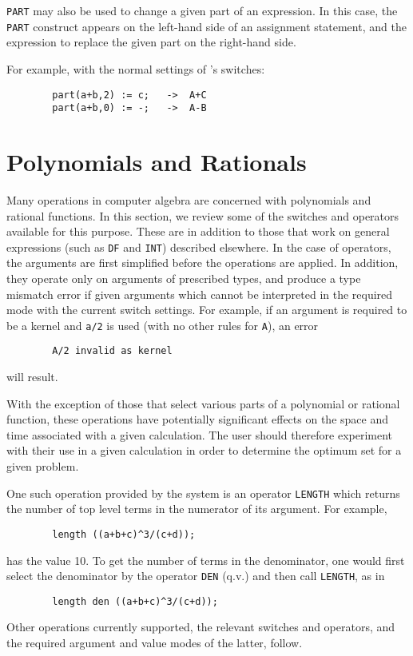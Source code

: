 {\tt PART} may also be used to change a given part of an expression.  In
this case, the {\tt PART} construct appears on the left-hand side of an
assignment statement, and the expression to replace the given part on the
right-hand side.

For example, with the normal settings of {\REDUCE's} switches:
\begin{verbatim}
        part(a+b,2) := c;   ->  A+C
        part(a+b,0) := -;   ->  A-B
\end{verbatim}

\chapter{Polynomials and Rationals}

Many operations in computer algebra are concerned with polynomials
 and rational functions.  In
this section, we review some of the switches and operators available for
this purpose.  These are in addition to those that work on general
expressions (such as {\tt DF} and {\tt INT}) described elsewhere.  In the
case of operators, the arguments are first simplified before the
operations are applied.  In addition, they operate only on arguments of
prescribed types, and produce a type mismatch error if given arguments
which cannot be interpreted in the required mode with the current switch
settings.  For example, if an argument is required to be a kernel and
{\tt a/2} is used (with no other rules for {\tt A}), an error
\begin{verbatim}
        A/2 invalid as kernel
\end{verbatim}
will result.

With the exception of those that select various parts of a polynomial or
rational function, these operations have potentially significant effects on
the space and time associated with a given calculation. The user should
therefore experiment with their use in a given calculation in order to
determine the optimum set for a given problem.

One such operation provided by the system is an operator {\tt LENGTH}
 which returns the number of top level terms in the
numerator of its argument.  For example,
\begin{verbatim}
        length ((a+b+c)^3/(c+d));
\end{verbatim}
has the value 10.  To get the number of terms in the denominator, one
would first select the denominator by the operator {\tt DEN} 
(q.v.) and then call {\tt LENGTH}, as in
\begin{verbatim}
        length den ((a+b+c)^3/(c+d));
\end{verbatim}
Other operations currently supported, the relevant switches and operators,
and the required argument and value modes of the latter, follow.


